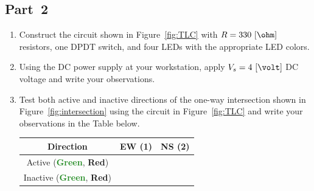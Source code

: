 \subsection{Part~2}
\label{sec:part2}
\begin{enumerate}
\item Construct the circuit shown in Figure~\ref{fig:TLC} with $R=330~[\ohm]$ resistors, one DPDT switch, and four LEDs with the appropriate LED colors. 
  
\item Using the DC power supply at your workstation, apply $V_s = 4~[\volt]$ DC voltage and write your observations.
  
\item Test both active and inactive directions of the one-way intersection shown in Figure~\ref{fig:intersection} using the circuit in Figure~\ref{fig:TLC} and write your observations in the Table below. 

  \begin{center}
    \begin{tabular}{c|c|c}
      Direction & EW (1)  & NS (2)\\
      \toprule
      Active (\textcolor{ForestGreen}{\textbf{Green}}, \textcolor{BrickRed}{\textbf{Red}}) & & \\
      \hline
      Inactive (\textcolor{ForestGreen}{\textbf{Green}}, \textcolor{BrickRed}{\textbf{Red}}) & & \\
      \bottomrule
    \end{tabular}    
  \end{center}
  
 \end{enumerate}

